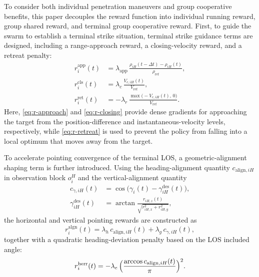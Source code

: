 \documentclass{cja}
\begin{document}
To consider both individual penetration maneuvers and group cooperative benefits, this paper decouples the reward function into individual running reward, group shared reward, and terminal group cooperative reward.
First, to guide the swarm to establish a terminal strike situation, terminal strike guidance terms are designed, including a range-approach reward, a closing-velocity reward, and a retreat penalty:
\begin{align}
r_i^{\mathrm{app}}(t)&=\lambda_{\mathrm{app}}\,\frac{\rho_{iH}(t-\Delta t)-\rho_{iH}(t)}{\rho_{\mathrm{ref}}},
\label{eq:r-approach}\\
r_i^{\mathrm{cls}}(t)&=\lambda_{c}\,\frac{V_{c,iH}(t)}{V_{\mathrm{ref}}},
\label{eq:r-closing}\\
r_i^{\mathrm{ret}}(t)&=-\lambda_r\,\frac{\max\bigl(-V_{c,iH}(t),\,0\bigr)}{V_{\mathrm{ref}}}.
\label{eq:r-retreat}
\end{align}
Here, \eqref{eq:r-approach} and \eqref{eq:r-closing} provide dense gradients for approaching the target from the position-difference and instantaneous-velocity levels, respectively, while \eqref{eq:r-retreat} is used to prevent the policy from falling into a local optimum that moves away from the target.

To accelerate pointing convergence of the terminal LOS, a geometric-alignment shaping term is further introduced. Using the heading-alignment quantity $c_{\mathrm{align},iH}$ in observation block $o_i^{H}$ and the vertical-alignment quantity
\begin{equation}
\begin{aligned}
c_{\gamma,iH}(t)
&=\cos\!\bigl(\gamma_i(t)-\gamma_{iH}^{\mathrm{des}}(t)\bigr),\\
\gamma_{iH}^{\mathrm{des}}(t)
&=\arctan\!\frac{r_{iH,z}(t)}{\sqrt{r_{iH,x}^{2}+r_{iH,y}^{2}}},
\end{aligned}
\end{equation}
the horizontal and vertical pointing rewards are constructed as
\begin{equation}
r_i^{\mathrm{algn}}(t)=\lambda_h\,c_{\mathrm{align},iH}(t)+\lambda_g\,c_{\gamma,iH}(t),
\label{eq:r-align}
\end{equation}
together with a quadratic heading-deviation penalty based on the LOS included angle:
\begin{equation}
r_i^{\mathrm{herr}}(t)=-\lambda_e\,\Bigl(\dfrac{\arccos c_{\mathrm{align},iH}(t)}{\pi}\Bigr)^{2}.
\label{eq:r-herr}
\end{equation}
\end{document}

